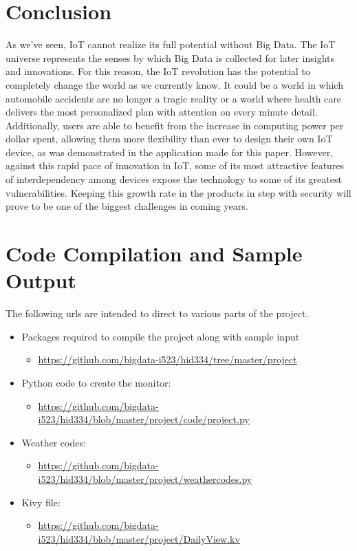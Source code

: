 \documentclass[sigconf]{acmart}
\begin{document}
\section{Conclusion}
As we've seen, IoT cannot realize its full potential without Big Data. The IoT universe represents the senses by which Big Data is collected for later insights and innovations. For this reason, the IoT revolution has the potential to completely change the world as we currently know. It could be a world in which automobile accidents are no longer a tragic reality or a world where health care delivers the most personalized plan with attention on every minute detail. Additionally, users are able to benefit from the increase in computing power per dollar spent, allowing them more flexibility than ever to design their own IoT device, as was demonstrated in the application made for this paper. However, against this rapid pace of innovation in IoT, some of its most attractive features of interdependency among devices expose the technology to some of its greatest vulnerabilities. Keeping this growth rate in the products in step with security will prove to be one of the biggest challenges in coming years. 

\appendix

\section{Code Compilation and Sample Output}
The following urls are intended to direct to various parts of the project. 
\begin{itemize}
    \item Packages required to compile the project along with sample input
        \begin{itemize}
            \item \url{https://github.com/bigdata-i523/hid334/tree/master/project}
        \end{itemize}
    \item Python code to create the monitor: 
        \begin{itemize}
            \item \url{https://github.com/bigdata-i523/hid334/blob/master/project/code/project.py}
        \end{itemize}
    \item Weather codes: 
        \begin{itemize}
            \item \url{https://github.com/bigdata-i523/hid334/blob/master/project/weathercodes.py}
        \end{itemize}
    \item Kivy file: 
        \begin{itemize}
            \item \url{https://github.com/bigdata-i523/hid334/blob/master/project/DailyView.kv}
        \end{itemize}
    
    
\end{itemize}
\end{document}
